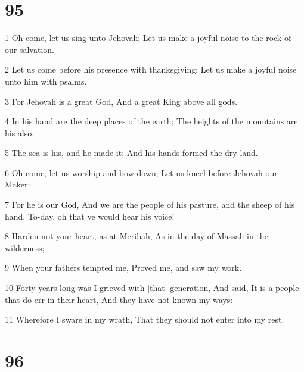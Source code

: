 \chapter{95}

\par 1 Oh come, let us sing unto Jehovah; Let us make a joyful noise to the rock of our salvation.
\par 2 Let us come before his presence with thanksgiving; Let us make a joyful noise unto him with psalms.
\par 3 For Jehovah is a great God, And a great King above all gods.
\par 4 In his hand are the deep places of the earth; The heights of the mountains are his also.
\par 5 The sea is his, and he made it; And his hands formed the dry land.
\par 6 Oh come, let us worship and bow down; Let us kneel before Jehovah our Maker:
\par 7 For he is our God, And we are the people of his pasture, and the sheep of his hand. To-day, oh that ye would hear his voice!
\par 8 Harden not your heart, as at Meribah, As in the day of Massah in the wilderness;
\par 9 When your fathers tempted me, Proved me, and saw my work.
\par 10 Forty years long was I grieved with [that] generation, And said, It is a people that do err in their heart, And they have not known my ways:
\par 11 Wherefore I sware in my wrath, That they should not enter into my rest.

\chapter{96}

